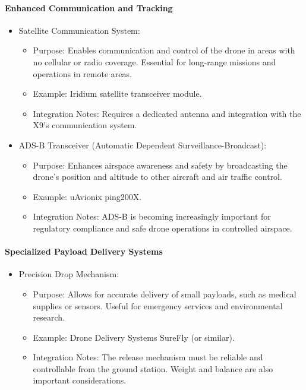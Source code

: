 \paragraph{Enhanced Communication and Tracking}
\begin{itemize}
\item Satellite Communication System:
\begin{itemize}
\item Purpose: Enables communication and control of the drone in areas with no cellular or radio coverage. Essential for long-range missions and operations in remote areas.
\item Example: Iridium satellite transceiver module.
\item Integration Notes: Requires a dedicated antenna and integration with the X9's communication system.
\end{itemize}

\item ADS-B Transceiver (Automatic Dependent Surveillance-Broadcast):
\begin{itemize}
\item Purpose: Enhances airspace awareness and safety by broadcasting the drone's position and altitude to other aircraft and air traffic control.
\item Example: uAvionix ping200X.
\item Integration Notes: ADS-B is becoming increasingly important for regulatory compliance and safe drone operations in controlled airspace.
\end{itemize}
\end{itemize}

\paragraph{Specialized Payload Delivery Systems}
\begin{itemize}
\item Precision Drop Mechanism:
\begin{itemize}
\item Purpose: Allows for accurate delivery of small payloads, such as medical supplies or sensors. Useful for emergency services and environmental research.
\item Example: Drone Delivery Systems SureFly (or similar).
\item Integration Notes: The release mechanism must be reliable and controllable from the ground station. Weight and balance are also important considerations.
\end{itemize}
\end{itemize}

